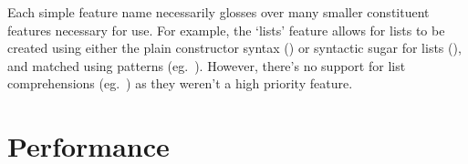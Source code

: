 \documentclass[dissertation.tex]{subfiles}
\begin{document}
{    

    Each simple feature name necessarily glosses over many smaller constituent features necessary for use. For example,
    the `lists' feature allows for lists to be created using either the plain constructor syntax
    () or syntactic sugar for lists (\haskell{[1,2,3]}), and matched using patterns (eg.\
    \haskell{[x,y] = [1,2]}). However, there's no support for list comprehensions (eg.\ \haskell{[f x | x <- [1,2,3],
    even x]}) as they weren't a high priority feature.
    

}
\section{Performance}
{



}
\end{document}

